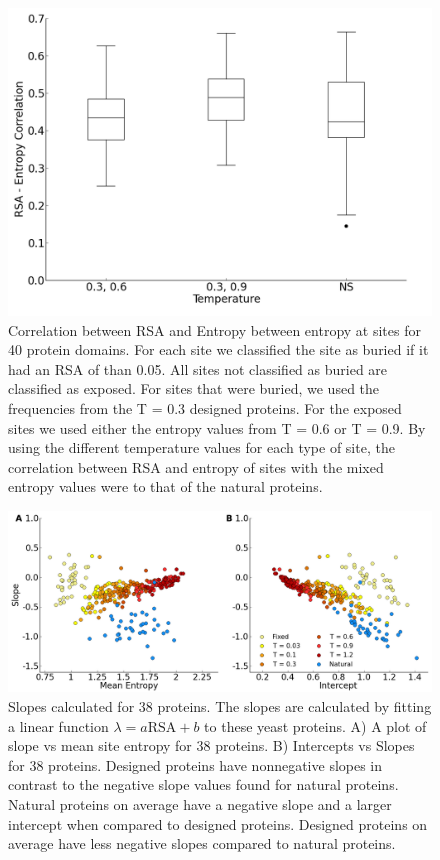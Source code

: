 \documentclass[12pt]{article}
\begin{document}
\begin{figure}[H]
\centerline{\includegraphics[width = 6in]{figures/Noah_Mixed_Temp_Correlation_Plot.png}}
\caption{Correlation between RSA and Entropy between entropy at sites for 40 protein domains. For each site we classified the site as buried if it had an RSA of than 0.05. All sites not classified as buried are classified as exposed. For sites that were buried, we used the frequencies from the T = 0.3 designed proteins. For the exposed sites we used either the entropy values from T = 0.6 or T = 0.9. By using the different temperature values for each type of site, the correlation between RSA and entropy of sites with the mixed entropy values were to that of the natural proteins.}
\label{Mixed_RSA_Entropy_Noah}
\end{figure}

\begin{figure}[H]
\centering
\centerline{\includegraphics[width = 6in]{figures/Slope_Combination_Plot.png}}
\caption{Slopes calculated for 38 proteins. The slopes are calculated by fitting a linear function $\lambda=a\text{RSA}+b$ to these yeast proteins.  A) A plot of slope vs mean site entropy for 38 proteins. B) Intercepts vs Slopes for 38 proteins. Designed proteins have nonnegative slopes in contrast to the negative slope values found for natural proteins.  Natural proteins on average have a negative slope and a larger intercept when compared to designed proteins. Designed proteins on average have less negative slopes compared to natural proteins.}
\label{StructureFig3}
\end{figure}
\end{document}
